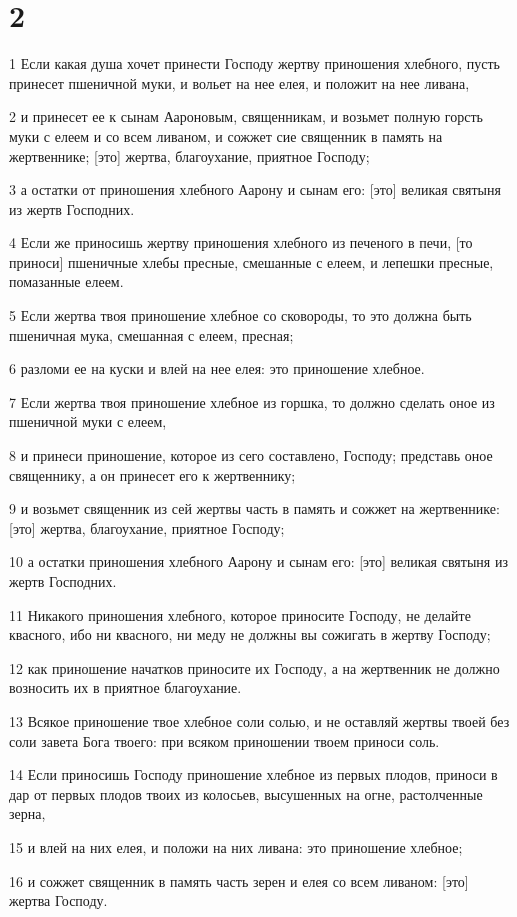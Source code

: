 \chapter{2}

\par 1 Если какая душа хочет принести Господу жертву приношения хлебного, пусть принесет пшеничной муки, и вольет на нее елея, и положит на нее ливана,
\par 2 и принесет ее к сынам Аароновым, священникам, и возьмет полную горсть муки с елеем и со всем ливаном, и сожжет сие священник в память на жертвеннике; [это] жертва, благоухание, приятное Господу;
\par 3 а остатки от приношения хлебного Аарону и сынам его: [это] великая святыня из жертв Господних.
\par 4 Если же приносишь жертву приношения хлебного из печеного в печи, [то приноси] пшеничные хлебы пресные, смешанные с елеем, и лепешки пресные, помазанные елеем.
\par 5 Если жертва твоя приношение хлебное со сковороды, то это должна быть пшеничная мука, смешанная с елеем, пресная;
\par 6 разломи ее на куски и влей на нее елея: это приношение хлебное.
\par 7 Если жертва твоя приношение хлебное из горшка, то должно сделать оное из пшеничной муки с елеем,
\par 8 и принеси приношение, которое из сего составлено, Господу; представь оное священнику, а он принесет его к жертвеннику;
\par 9 и возьмет священник из сей жертвы часть в память и сожжет на жертвеннике: [это] жертва, благоухание, приятное Господу;
\par 10 а остатки приношения хлебного Аарону и сынам его: [это] великая святыня из жертв Господних.
\par 11 Никакого приношения хлебного, которое приносите Господу, не делайте квасного, ибо ни квасного, ни меду не должны вы сожигать в жертву Господу;
\par 12 как приношение начатков приносите их Господу, а на жертвенник не должно возносить их в приятное благоухание.
\par 13 Всякое приношение твое хлебное соли солью, и не оставляй жертвы твоей без соли завета Бога твоего: при всяком приношении твоем приноси соль.
\par 14 Если приносишь Господу приношение хлебное из первых плодов, приноси в дар от первых плодов твоих из колосьев, высушенных на огне, растолченные зерна,
\par 15 и влей на них елея, и положи на них ливана: это приношение хлебное;
\par 16 и сожжет священник в память часть зерен и елея со всем ливаном: [это] жертва Господу.

